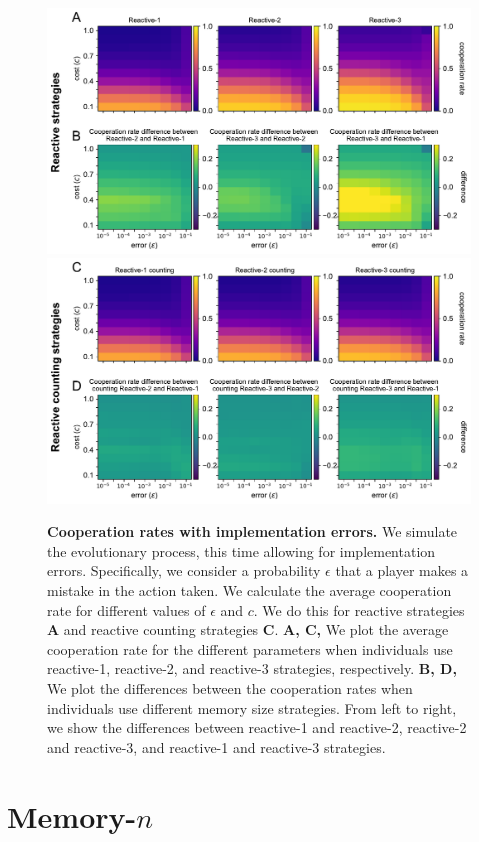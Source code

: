 \documentclass[11pt]{article}
\theoremstyle{plainCl1}
\theoremstyle{plainCl2}
\begin{document}
\begin{figure}[h]
    \centering
    \includegraphics[width=.65\textwidth]{../../figures/siFig2Errors.pdf} \\[2em]
    \includegraphics[width=.65\textwidth]{../../figures/siFigErrorsCounting.pdf}
    \caption{
    \textbf{Cooperation rates with implementation errors.}
  We simulate the evolutionary process, this time allowing for implementation
  errors. Specifically, we consider a probability \(\epsilon\) that a player makes
  a mistake in the action taken. We calculate the average cooperation rate for
  different values of \(\epsilon\) and \(c\). We do this for reactive strategies
  {\bf A} and reactive counting strategies {\bf C}. {\bf A, C,} We plot the average
  cooperation rate for the different parameters when individuals use reactive-1,
  reactive-2, and reactive-3 strategies, respectively. {\bf B, D,} We plot the
  differences between the cooperation rates when individuals use different memory
  size strategies. From left to right, we show the differences between reactive-1
  and reactive-2, reactive-2 and reactive-3, and reactive-1 and reactive-3
  strategies.
    }\label{fig:errors}
\end{figure}




\newpage

\section{Memory-$n$}
\end{document}
